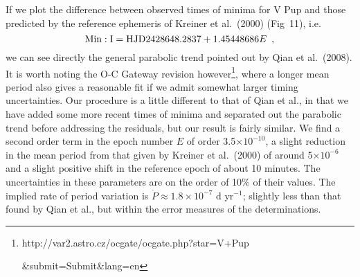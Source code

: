 \documentclass[useAMS,usenatbib]{mnras}                                                                           \usepackage[pdftex]{graphicx}
\begin{document}
 If we plot the difference between observed times of minima for V Pup
 and those predicted by the reference ephemeris of Kreiner et al.\ (2000) (Fig~11), i.e.\
\begin{equation}
{\rm Min: I} = {\rm HJD} 2428648.2837 + 1.45448686E \,\,\,  ,
\end{equation} 
 we can see directly the general parabolic trend pointed out by Qian et al.\ (2008).  
 It is worth noting the O-C Gateway revision 
 however\footnote{ http://var2.astro.cz/ocgate/ocgate.php?star=V+Pup
 
  {\&}submit=Submit{\&}lang=en}, 
 where a longer mean period also gives a reasonable fit if we admit somewhat 
 larger timing uncertainties. 
 Our procedure is a little different to that of Qian et al.,
 in that we have added some more recent times of minima and
 separated out the parabolic trend before addressing the residuals, but our 
 result is fairly similar.  We find a second order term in the
 epoch number $E$ of order 3.5$\times 10^{-10}$, a slight reduction
 in the mean period from that given by Kreiner et al.\ (2000) of around
  5$\times 10^{-6}$ and a slight positive shift in the reference epoch of about 10 minutes.
  The uncertainties in these parameters are on the order of 10\% of their values.
  The implied rate of period variation is $\dot {P} \approx  1.8\times 10^{-7}$ d yr$^{-1}$;
  slightly less than that found by Qian et al., but within the error measures
  of the determinations.
  
\end{document}

